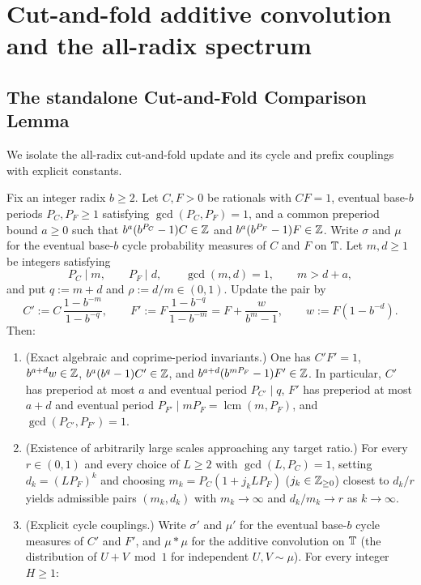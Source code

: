 \documentclass[11pt]{article}
\DeclareMathOperator{\lcm}{lcm}
\begin{document}
\section{Cut-and-fold additive convolution and the all-radix spectrum}\label{sec:allradix}

\subsection{The standalone Cut-and-Fold Comparison Lemma}

We isolate the all-radix cut-and-fold update and its cycle and prefix couplings with explicit constants.

\begin{lemma}\label{lem:cutfold}
Fix an integer radix $b\ge2$. Let $C,F>0$ be rationals with $CF=1$, eventual base-$b$ periods $P_C,P_F\ge1$ satisfying $\gcd(P_C,P_F)=1$, and a common preperiod bound $a\ge0$ such that $b^a(b^{P_C}-1)C\in\mathbb Z$ and $b^a(b^{P_F}-1)F\in\mathbb Z$. Write $\sigma$ and $\mu$ for the eventual base-$b$ cycle probability measures of $C$ and $F$ on $\mathbb T$. Let $m,d\ge1$ be integers satisfying
\[
P_C\mid m,\qquad P_F\mid d,\qquad \gcd(m,d)=1,\qquad m>d+a,
\]
and put $q:=m+d$ and $\rho:=d/m\in(0,1)$. Update the pair by
\begin{equation}\label{eq:cutfold-update}
C':=C\,\frac{1-b^{-m}}{1-b^{-q}},\qquad
F':=F\,\frac{1-b^{-q}}{1-b^{-m}}=F+\frac{w}{b^m-1},\qquad
w:=F(1-b^{-d}).
\end{equation}
Then:
\begin{enumerate}[label=\textup{(\arabic*)},nosep]
\item \textup{(Exact algebraic and coprime-period invariants.)} One has $C'F'=1$, $b^{a+d}w\in\mathbb Z$, $b^a(b^q-1)C'\in\mathbb Z$, and $b^{a+d}(b^{mP_F}-1)F'\in\mathbb Z$. In particular, $C'$ has preperiod at most $a$ and eventual period $P_{C'}\mid q$, $F'$ has preperiod at most $a+d$ and eventual period $P_{F'}\mid mP_F=\lcm(m,P_F)$, and $\gcd(P_{C'},P_{F'})=1$.
\item \textup{(Existence of arbitrarily large scales approaching any target ratio.)} For every $r\in(0,1)$ and every choice of $L\ge2$ with $\gcd(L,P_C)=1$, setting $d_k=(LP_F)^k$ and choosing $m_k=P_C(1+j_kLP_F)$ ($j_k\in\mathbb Z_{\ge0}$) closest to $d_k/r$ yields admissible pairs $(m_k,d_k)$ with $m_k\to\infty$ and $d_k/m_k\to r$ as $k\to\infty$.
\item \textup{(Explicit cycle couplings.)} Write $\sigma'$ and $\mu'$ for the eventual base-$b$ cycle measures of $C'$ and $F'$, and $\mu*\mu$ for the additive convolution on $\mathbb T$ (the distribution of $U+V\bmod1$ for independent $U,V\sim\mu$). For every integer $H\ge1$:

\end{enumerate}
\end{lemma}
\end{document}
